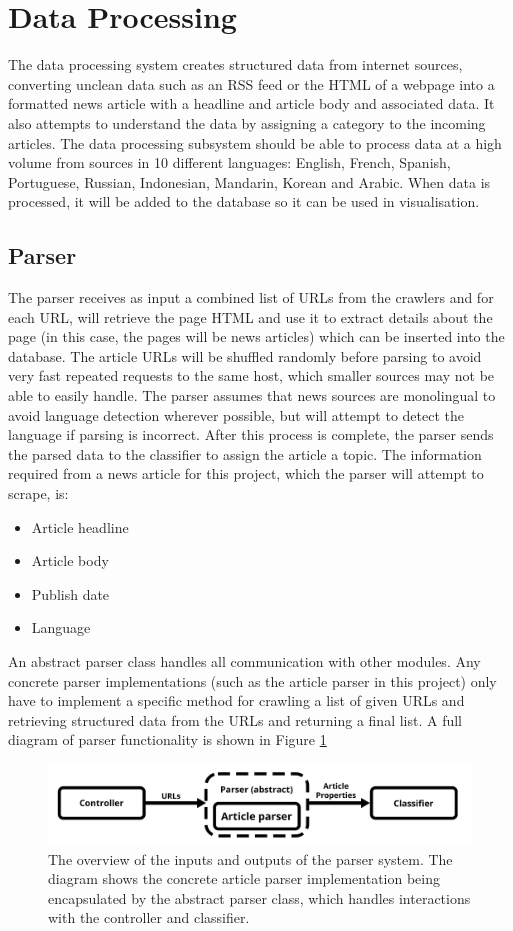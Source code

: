 \documentclass{l4proj}
\begin{document}
\section{Data Processing}
The data processing system creates structured data from internet sources, converting unclean data such as an RSS feed or the HTML of a webpage into a formatted news article with a headline and article body and associated data. It also attempts to understand the data by assigning a category to the incoming articles. The data processing subsystem should be able to process data at a high volume from sources in 10 different languages: English, French, Spanish, Portuguese, Russian, Indonesian, Mandarin, Korean and Arabic. When data is processed, it will be added to the database so it can be used in visualisation.

\subsection{Parser}
The parser receives as input a combined list of URLs from the crawlers and for each URL, will retrieve the page HTML and use it to extract details about the page (in this case, the pages will be news articles) which can be inserted into the database. The article URLs will be shuffled randomly before parsing to avoid very fast repeated requests to the same host, which smaller sources may not be able to easily handle. The parser assumes that news sources are monolingual to avoid language detection wherever possible, but will attempt to detect the language if parsing is incorrect. After this process is complete, the parser sends the parsed data to the classifier to assign the article a topic. The information required from a news article for this project, which the parser will attempt to scrape, is:
\begin{itemize}
    \item Article headline
    \item Article body
    \item Publish date
    \item Language
\end{itemize}
 An abstract parser class handles all communication with other modules. Any concrete parser implementations (such as the article parser in this project) only have to implement a specific method for crawling a list of given URLs and retrieving structured data from the URLs and returning a final list. A full diagram of parser functionality is shown in Figure \ref{fig:parser_diagram}
 \begin{figure}[h]
\centering
\includegraphics[width=\textwidth]{images/Parser-diagram.png}
\caption{The overview of the inputs and outputs of the parser system. The diagram shows the concrete article parser implementation being encapsulated by the abstract parser class, which handles interactions with the controller and classifier.}
\label{fig:parser_diagram}
\end{figure}
\end{document}
